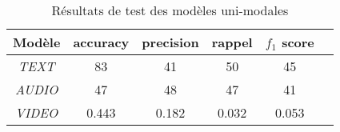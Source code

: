 \begin{table}[H]
    \centering
    \begin{tabular}{|c|c|c|c|c|c|}
        \hline
        Modèle & accuracy & precision & rappel & $f_1$ score\\
        \hline
        \textit{TEXT} & 83 & 41 & 50 & 45\\
        \hline
        \textit{AUDIO} & 47 & 48 & 47 & 41\\
        \hline
        \textit{VIDEO} & 0.443 & 0.182 & 0.032 & 0.053\\
        \hline
    \end{tabular}
    \caption{Résultats de test des modèles uni-modales}
    \label{tab: test unimodal}
\end{table}